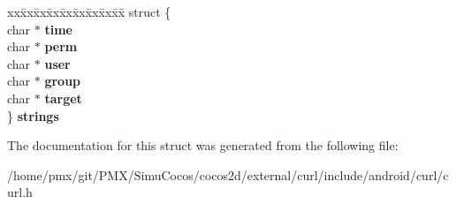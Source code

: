 \begin{DoxyCompactItemize}
\begin{tabbing}
\end{tabbing}\item 
\mbox{\label{structcurl__fileinfo_a7ec846f76d0925b279ffd5a354b754a5}} 
\begin{tabbing}
xx\=xx\=xx\=xx\=xx\=xx\=xx\=xx\=xx\=\kill
struct \{\\
\>char $\ast$ {\bfseries time}\\
\>char $\ast$ {\bfseries perm}\\
\>char $\ast$ {\bfseries user}\\
\>char $\ast$ {\bfseries group}\\
\>char $\ast$ {\bfseries target}\\
\} {\bfseries strings}\\

\end{tabbing}\end{DoxyCompactItemize}


The documentation for this struct was generated from the following file\+:\begin{DoxyCompactItemize}
\item 
/home/pmx/git/\+P\+M\+X/\+Simu\+Cocos/cocos2d/external/curl/include/android/curl/curl.\+h\end{DoxyCompactItemize}
